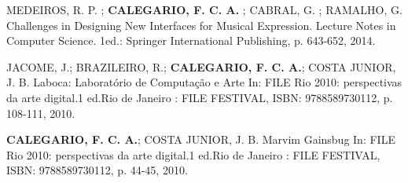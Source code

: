 \begin{cvparagraph}
MEDEIROS, R. P. ; \textbf{CALEGARIO, F. C. A.} ; CABRAL, G. ; RAMALHO, G. Challenges in Designing New Interfaces for Musical Expression. Lecture Notes in Computer Science. 1ed.: Springer International Publishing, p. 643-652, 2014.
\end{cvparagraph}
\begin{cvparagraph}
JACOME, J.; BRAZILEIRO, R.; \textbf{CALEGARIO, F. C. A.}; COSTA JUNIOR, J. B. Laboca: Laboratório de Computação e Arte In: FILE Rio 2010: perspectivas da arte digital.1 ed.Rio de Janeiro : FILE FESTIVAL, ISBN: 9788589730112, p. 108­-111, 2010.
\end{cvparagraph}
\begin{cvparagraph}
\textbf{CALEGARIO, F. C. A.}; COSTA JUNIOR, J. B. Marvim Gainsbug In: FILE Rio 2010: perspectivas da arte digital.1 ed.Rio de Janeiro : FILE FESTIVAL, ISBN: 9788589730112, p. 44­-45, 2010. 
\end{cvparagraph}


